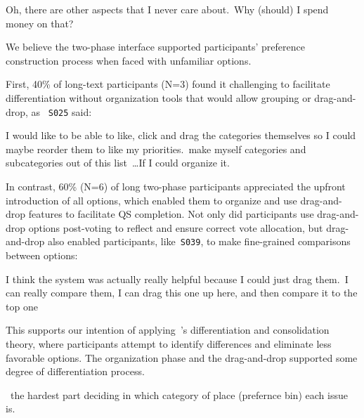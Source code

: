 \begin{displayquote}
Oh, there are other aspects that I never care about.~\bracketellipsis Why (should) I spend money on that? \hfill{}
\end{displayquote}

We believe the two-phase interface supported participants' preference construction process when faced with unfamiliar options.

First, 40\% of long-text participants (N=3) found it challenging to facilitate differentiation without organization tools that would allow grouping or drag-and-drop, as ~\texttt{S025} said:

\begin{displayquote}
    I would like to be able to like, click and drag the categories themselves so I could maybe reorder them to like my priorities.~\bracketellipsis make myself categories and subcategories out of this list~\ldots If I could organize it. \hfill{}
\end{displayquote}

In contrast, 60\% (N=6) of long two-phase participants appreciated the upfront introduction of all options, which enabled them to organize and use drag-and-drop features to facilitate QS completion. Not only did participants use drag-and-drop options post-voting to reflect and ensure correct vote allocation, but drag-and-drop also enabled participants, like~\texttt{S039}, to make fine-grained comparisons between options:

\begin{displayquote}  
    I think the system was actually really helpful because I could just drag them.~\bracketellipsis I can really compare them, I can drag this one up here, and then compare it to the top one~\bracketellipsis \hfill{}  
\end{displayquote}  

This supports our intention of applying~\citet{svensonDifferentiationConsolidationTheory1992}'s differentiation and consolidation theory, where participants attempt to identify differences and eliminate less favorable options. The organization phase and the drag-and-drop supported some degree of differentiation process.

\begin{displayquote}
    ~\bracketellipsis the hardest part deciding in which category of place (prefernce bin) each issue is. \hfill{}
\end{displayquote}

